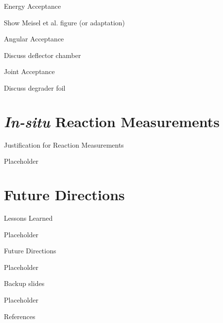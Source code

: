 \documentclass[10pt]{beamer}
\begin{document}
\begin{frame}{Energy Acceptance}

    Show Meisel et al. figure (or adaptation)

\end{frame}

\begin{frame}{Angular Acceptance}

    Discuss deflector chamber

\end{frame}

\begin{frame}{Joint Acceptance}

    Discuss degrader foil

\end{frame}

\section{\textit{In-situ} Reaction Measurements}

\begin{frame}{Justification for Reaction Measurements}

    Placeholder

\end{frame}

\section{Future Directions}

\begin{frame}{Lessons Learned}

    Placeholder

\end{frame}

\begin{frame}{Future Directions}

    Placeholder

\end{frame}

\appendix

\begin{frame}[fragile]{Backup slides}

    Placeholder

\end{frame}

\begin{frame}[allowframebreaks]{References}

  
  

\end{frame}
\end{document}
